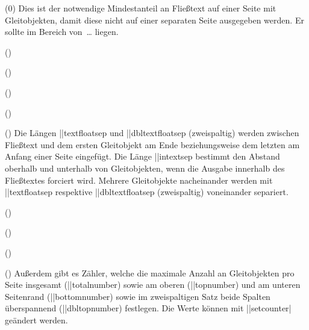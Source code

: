 \begin{Entity}{}
\begin{Declaration}
  {}
  (0\textfraction)
\printdeclarationlist
%
Dies ist der notwendige Mindestanteil an Fließtext auf einer Seite mit 
Gleitobjekten, damit diese nicht auf einer separaten Seite ausgegeben werden. 
Er sollte im Bereich von~\dots{} liegen.
\end{Declaration}

\begin{Declaration}
  {}
  (\the\textfloatsep)
\begin{Declaration}
  {}
  (\the\dbltextfloatsep)
\begin{Declaration}
  {}
  (\the\intextsep)
\begin{Declaration}
  {}
  (\the\floatsep)
\begin{Declaration}
  {}
  (\the\dblfloatsep)
Die Längen \Length||{textfloatsep} und \Length||{dbltextfloatsep} (zweispaltig) 
werden zwischen Fließtext und dem ersten Gleitobjekt am Ende beziehungsweise 
dem letzten am Anfang einer Seite eingefügt. Die Länge \Length||{intextsep} 
bestimmt den Abstand oberhalb und unterhalb von Gleitobjekten, wenn die Ausgabe 
innerhalb des Fließtextes forciert wird. Mehrere Gleitobjekte nacheinander 
werden mit \Length||{textfloatsep} respektive \Length||{dbltextfloatsep} 
(zweispaltig) voneinander separiert.
\end{Declaration}
\end{Declaration}
\end{Declaration}
\end{Declaration}
\end{Declaration}

\begin{Declaration}
  {}
  ()
\begin{Declaration}
  {}
  ()
\begin{Declaration}
  {}
  ()
\begin{Declaration}
  {}
  ()
\printdeclarationlist
%
Außerdem gibt es Zähler, welche die maximale Anzahl an Gleitobjekten pro Seite 
insgesamt (\Counter||{totalnumber}) sowie am oberen (\Counter||{topnumber}) 
und am unteren Seitenrand (\Counter||{bottomnumber}) sowie im zweispaltigen 
Satz beide Spalten überspannend (\Counter||{dbltopnumber}) festlegen. Die Werte 
können mit \Macro||{setcounter|} geändert werden.
\end{Declaration}
\end{Declaration}
\end{Declaration}
\end{Declaration}


\end{Entity}
